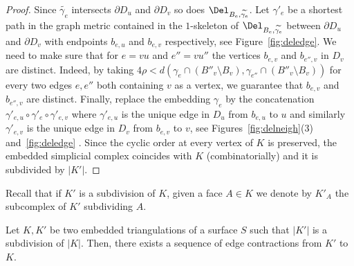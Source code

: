 \begin{proof}
    Since $\widetilde{\gamma_e}$ intersects $\partial D_u$ and $\partial D_v$ so does $\Del_{B_e,\widetilde{\gamma_e}}$. Let $\gamma'_e$  be a shortest path in the graph metric contained in the $1$-skeleton of $\Del_{B_e,\widetilde{\gamma_e}}$ between $\partial D_u$ and $\partial D_v$ with endpoints $b_{e,u}$ and $b_{e,v}$ respectively, see Figure~\ref{fig:deledge}. 
We need to make sure that for $e=vu$ and $e''=vu''$ the vertices $b_{e,v}$ and $b_{e'',v}$ in $D_v$ are distinct. Indeed, by taking $4\rho< d(\gamma_e\cap(B''_v\setminus B_v), \gamma_{e''}\cap(B''_v\setminus B_v))$ for every two edges $e,e''$ both containing $v$ as a vertex, we guarantee that $b_{e,v}$ and $b_{e'',v}$ are distinct.
    Finally, replace the embedding $\gamma_e$ by the concatenation $\gamma'_{e,u}\circ \gamma'_e\circ \gamma'_{e,v}$ where $\gamma'_{e,u}$ is the unique 
    edge in $D_u$ from $b_{e,u}$ to $u$ and similarly $\gamma'_{e,v}$ is the unique 
    edge in $D_v$ from $b_{e,v}$ to $v$, see Figures~\ref{fig:delneigh}(3) and~\ref{fig:deledge} . Since the cyclic order at every vertex of $K$ is preserved, the embedded simplicial complex coincides with $K$ (combinatorially) and it is subdivided by $|K'|$.
\end{proof}
%
%
Recall that if $K'$ is a subdivision of $K$, given a face $A\in K$ we denote by $K'_A$ the subcomplex of $K'$ subdividing $A$.
%
\begin{proposition}
  \label{p:minor}
  Let $K,K'$ be two embedded triangulations of a surface $S$ such that $|K'|$ is a subdivision of $|K|$.
  Then, there exists a sequence of edge contractions from $K'$ to $K$.
\end{proposition}
